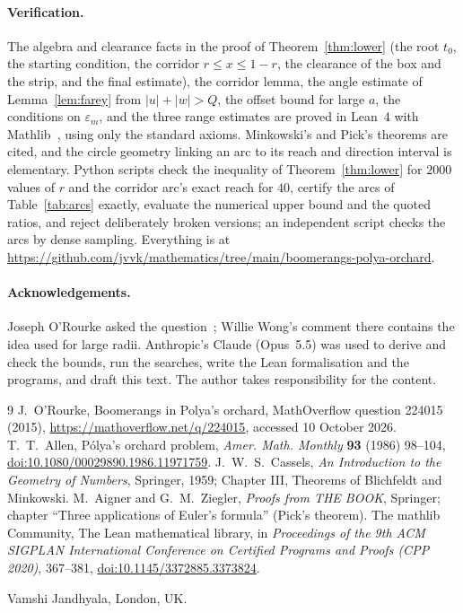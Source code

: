\documentclass[11pt]{article}
\begin{document}
\paragraph{Verification.} The algebra and clearance facts in the proof of Theorem~\ref{thm:lower} (the root $t_0$,
the starting condition, the corridor $r\le x\le1-r$, the clearance of the box and the strip, and the final estimate),
the corridor lemma, the angle estimate of Lemma~\ref{lem:farey} from $|u|+|w|>Q$, the offset bound for large $a$, the
conditions on $\varepsilon_m$, and the three range estimates are proved in Lean~4 with Mathlib~\cite{mathlib}, using
only the standard axioms. Minkowski's and Pick's theorems are cited, and the circle geometry linking an arc to its
reach and direction interval is elementary. Python scripts check the inequality of Theorem~\ref{thm:lower} for $2000$
values of $r$ and the corridor arc's exact reach for $40$, certify the arcs of Table~\ref{tab:arcs} exactly, evaluate the numerical upper bound and the quoted ratios, and
reject deliberately broken versions; an independent script checks the arcs by dense sampling. Everything is at
\url{https://github.com/jvvk/mathematics/tree/main/boomerangs-polya-orchard}.

\paragraph{Acknowledgements.} Joseph O'Rourke asked the question~\cite{MO}; Willie Wong's comment there contains the
idea used for large radii. Anthropic's Claude (Opus~5.5) was used to derive and check the bounds, run the searches,
write the Lean formalisation and the programs, and draft this text. The author takes responsibility for the content.

\begin{thebibliography}{9}
 J.~O'Rourke, Boomerangs in Polya's orchard, MathOverflow question 224015 (2015),
\url{https://mathoverflow.net/q/224015}, accessed 10 October 2026.
 T.~T.~Allen, P\'olya's orchard problem, \emph{Amer. Math. Monthly} \textbf{93} (1986) 98--104,
\href{https://doi.org/10.1080/00029890.1986.11971759}{doi:10.1080/00029890.1986.11971759}.
 J.~W.~S.~Cassels, \emph{An Introduction to the Geometry of Numbers}, Springer, 1959; Chapter III,
Theorems of Blichfeldt and Minkowski.
 M.~Aigner and G.~M.~Ziegler, \emph{Proofs from THE BOOK}, Springer; chapter ``Three applications of
Euler's formula'' (Pick's theorem).
 The mathlib Community, The Lean mathematical library, in \emph{Proceedings of the 9th ACM
SIGPLAN International Conference on Certified Programs and Proofs (CPP 2020)}, 367--381,
\href{https://doi.org/10.1145/3372885.3373824}{doi:10.1145/3372885.3373824}.
\end{thebibliography}

\bigskip
\noindent Vamshi Jandhyala, London, UK.
\end{document}
